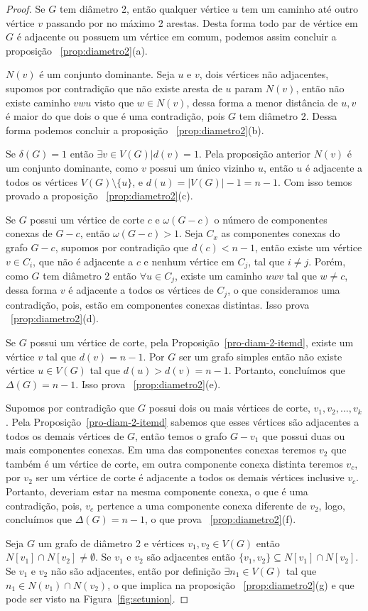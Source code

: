 \begin{proof}

Se $G$ tem diâmetro 2, então qualquer vértice $u$ tem um caminho até outro vértice $v$ passando por no máximo 2 arestas. Desta forma todo par de vértice em $G$ é adjacente ou possuem um vértice em comum, podemos assim concluir a proposição ~\ref{prop:diametro2}(a).

$N(v)$ é um conjunto dominante. Seja $u$ e $v$, dois vértices não adjacentes, supomos por contradição que não existe aresta de $u$ param $N(v)$, então não existe caminho $vwu$ visto que $w\in N(v)$, dessa forma a menor distância de $u,v$ é maior do que dois o que é uma contradição, pois $G$ tem diâmetro 2. Dessa forma podemos concluir a proposição ~\ref{prop:diametro2}(b).

Se $\delta(G)=1$ então $\exists v \in V(G)|d(v)=1$. Pela proposição anterior $N(v)$ é um conjunto dominante, como $v$ possui um único vizinho $u$, então $u$ é adjacente a todos os vértices $V(G)\setminus \{u\}$, e $d(u)=|V(G)|-1=n-1$. Com isso temos provado a proposição ~\ref{prop:diametro2}(c).

Se $G$ possui um vértice de corte $c$ e $\omega(G-c)$ o número de componentes conexas de $G-c$, então $\omega(G-c)>1$. Seja $C_x$ as componentes conexas do grafo $G-c$, supomos por contradição que $d(c)<n-1$, então existe um vértice $v \in C_i$, que não é adjacente a $c$ e nenhum vértice em $C_j$, tal que $i\neq j$. Porém, como $G$ tem diâmetro 2 então $\forall u \in C_j$, existe um caminho $uwv$ tal que $w\ne c$, dessa forma $v$ é adjacente a todos os vértices de $C_j$, o que consideramos uma contradição, pois, estão em componentes conexas distintas. Isso prova ~\ref{prop:diametro2}(d).

Se $G$ possui um vértice de corte, pela Proposição~\ref{pro-diam-2-itemd}, existe um vértice $v$ tal que $d(v)=n-1$. Por $G$ ser um grafo simples então não existe vértice $u\in V(G)$ tal que $d(u)>d(v)=n-1$. Portanto, concluímos que $\Delta (G) = n-1$. Isso prova ~\ref{prop:diametro2}(e).

Supomos por contradição que $G$ possui dois ou mais vértices de corte, $v_1,v_2,...,v_k$. Pela Proposição~\ref{pro-diam-2-itemd} sabemos que esses vértices são adjacentes a todos os demais vértices de $G$, então temos o grafo $G-v_1$ que possui duas ou mais componentes conexas. Em uma das componentes conexas teremos $v_2$ que também é um vértice de corte, em outra componente conexa distinta teremos $v_c$, por $v_2$ ser um vértice de corte é adjacente a todos os demais vértices inclusive $v_c$. Portanto, deveriam estar na mesma componente conexa, o que é uma contradição, pois, $v_c$ pertence a uma componente conexa diferente de $v_2$, logo, concluímos que $\Delta (G) = n-1$, o que prova ~\ref{prop:diametro2}(f).

Seja $G$ um grafo de diâmetro 2 e vértices $v_1,v_2 \in V(G)$ então $N[v_1] \cap N[v_2] \ne \emptyset$. Se $v_1$ e $v_2$ são adjacentes então $\{v_1, v_2\} \subseteq N[v_1] \cap N[v_2]$. Se $v_1$ e $v_2$ não são adjacentes, então por definição $\exists n_1 \in V(G)$ tal que $n_1 \in N(v_1) \cap N(v_2)$, o que implica na proposição ~\ref{prop:diametro2}(g) e que pode ser visto na Figura~\ref{fig:setunion}.
\end{proof}

